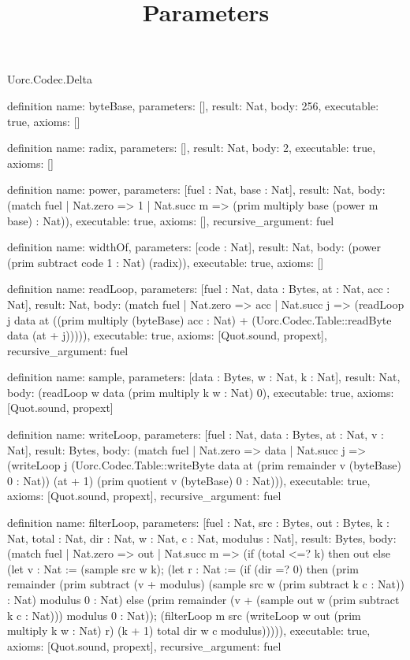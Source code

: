 \begin{lexlean}{Uorc.Codec.Delta}
\title{Parameters}
\begin{semanticmodule}
definition{
  name: byteBase,
  parameters: [],
  result: Nat,
  body: 256,
  executable: true,
  axioms: []
}

definition{
  name: radix,
  parameters: [],
  result: Nat,
  body: 2,
  executable: true,
  axioms: []
}

definition{
  name: power,
  parameters: [fuel : Nat, base : Nat],
  result: Nat,
  body: (match fuel
    | Nat.zero => 1
    | Nat.succ m => (prim multiply base (power m base) : Nat)),
  executable: true,
  axioms: [],
  recursive_argument: fuel
}

definition{
  name: widthOf,
  parameters: [code : Nat],
  result: Nat,
  body: (power (prim subtract code 1 : Nat) (radix)),
  executable: true,
  axioms: []
}

definition{
  name: readLoop,
  parameters: [fuel : Nat, data : Bytes, at : Nat, acc : Nat],
  result: Nat,
  body: (match fuel
    | Nat.zero => acc
    | Nat.succ j => (readLoop j data at ((prim multiply (byteBase) acc : Nat) + (Uorc.Codec.Table::readByte data (at + j))))),
  executable: true,
  axioms: [Quot.sound, propext],
  recursive_argument: fuel
}

definition{
  name: sample,
  parameters: [data : Bytes, w : Nat, k : Nat],
  result: Nat,
  body: (readLoop w data (prim multiply k w : Nat) 0),
  executable: true,
  axioms: [Quot.sound, propext]
}

definition{
  name: writeLoop,
  parameters: [fuel : Nat, data : Bytes, at : Nat, v : Nat],
  result: Bytes,
  body: (match fuel
    | Nat.zero => data
    | Nat.succ j => (writeLoop j (Uorc.Codec.Table::writeByte data at (prim remainder v (byteBase) 0 : Nat)) (at + 1) (prim quotient v (byteBase) 0 : Nat))),
  executable: true,
  axioms: [Quot.sound, propext],
  recursive_argument: fuel
}

definition{
  name: filterLoop,
  parameters: [fuel : Nat, src : Bytes, out : Bytes, k : Nat, total : Nat, dir : Nat, w : Nat, c : Nat, modulus : Nat],
  result: Bytes,
  body: (match fuel
    | Nat.zero => out
    | Nat.succ m => (if (total <=? k) then out else (let v : Nat := (sample src w k); (let r : Nat := (if (dir =? 0) then (prim remainder (prim subtract (v + modulus) (sample src w (prim subtract k c : Nat)) : Nat) modulus 0 : Nat) else (prim remainder (v + (sample out w (prim subtract k c : Nat))) modulus 0 : Nat)); (filterLoop m src (writeLoop w out (prim multiply k w : Nat) r) (k + 1) total dir w c modulus))))),
  executable: true,
  axioms: [Quot.sound, propext],
  recursive_argument: fuel
}


\end{semanticmodule}
\end{lexlean}

